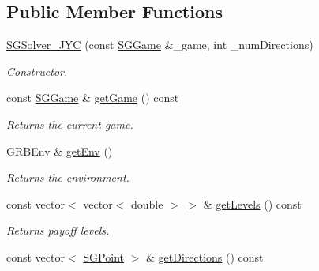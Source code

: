 \subsection*{Public Member Functions}
\begin{DoxyCompactItemize}
\item 
\mbox{\label{classSGSolver__JYC_ad96df40bd0f4957899807f0d986fed5c}} 
\hyperlink{classSGSolver__JYC_ad96df40bd0f4957899807f0d986fed5c}{S\+G\+Solver\+\_\+\+J\+YC} (const \hyperlink{classSGGame}{S\+G\+Game} \&\+\_\+game, int \+\_\+num\+Directions)
\begin{DoxyCompactList}\small\item\em Constructor. \end{DoxyCompactList}\item 
\mbox{\label{classSGSolver__JYC_a9a078110d65f2f3f93cec5f65611e46a}} 
const \hyperlink{classSGGame}{S\+G\+Game} \& \hyperlink{classSGSolver__JYC_a9a078110d65f2f3f93cec5f65611e46a}{get\+Game} () const
\begin{DoxyCompactList}\small\item\em Returns the current game. \end{DoxyCompactList}\item 
\mbox{\label{classSGSolver__JYC_a427c8b15a28974c66cea85bdd0741c64}} 
G\+R\+B\+Env \& \hyperlink{classSGSolver__JYC_a427c8b15a28974c66cea85bdd0741c64}{get\+Env} ()
\begin{DoxyCompactList}\small\item\em Returns the environment. \end{DoxyCompactList}\item 
\mbox{\label{classSGSolver__JYC_ac9cbab573aed7338139b117a63deb975}} 
const vector$<$ vector$<$ double $>$ $>$ \& \hyperlink{classSGSolver__JYC_ac9cbab573aed7338139b117a63deb975}{get\+Levels} () const
\begin{DoxyCompactList}\small\item\em Returns payoff levels. \end{DoxyCompactList}\item 
\mbox{\label{classSGSolver__JYC_a742b0eb85d4024eb5bc3ffd89f9a9b99}} 
const vector$<$ \hyperlink{classSGPoint}{S\+G\+Point} $>$ \& \hyperlink{classSGSolver__JYC_a742b0eb85d4024eb5bc3ffd89f9a9b99}{get\+Directions} () const

\end{DoxyCompactItemize}

